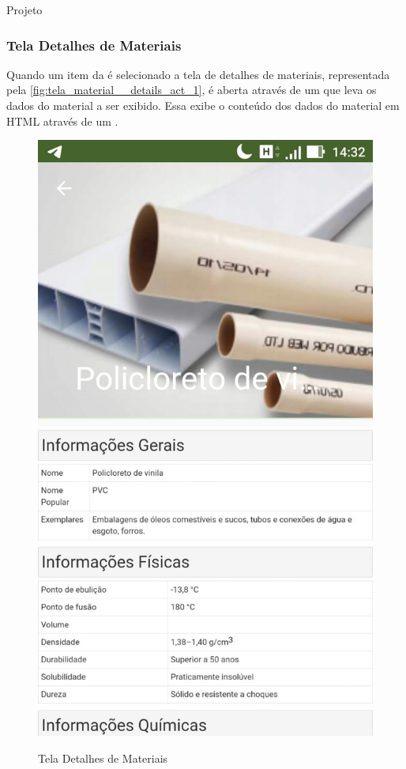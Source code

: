 \documentclass[
	12pt,				%
	openany,			%
	twoside,			%
	a4paper,			%
	english,			%
	french,				%
	spanish,			%
	brazil				%
	]{abntex2}
\begin{document}
\begin{chapter}{Projeto}
\newpage
\subsubsection{Tela Detalhes de Materiais} \label{ActivityMaterialDetails}
Quando um item da  é selecionado a tela de detalhes de materiais, representada pela \autoref{fig:tela_material__details_act_1}, é aberta através de um  que leva os dados do material a ser exibido. Essa  exibe o conteúdo dos dados do material em HTML através de um .

    \begin{figure}[htb]    
 \centering
  \begin{minipage}{0.45\textwidth}
    \centering
    \caption{Tela Detalhes de Materiais}
    \includegraphics[scale=0.45]{media/tela_material__details_act_1.jpg}
     \label{fig:tela_material__details_act_1}
  \end{minipage}
  \hfill
\end{figure}


\end{chapter}
\end{document}
